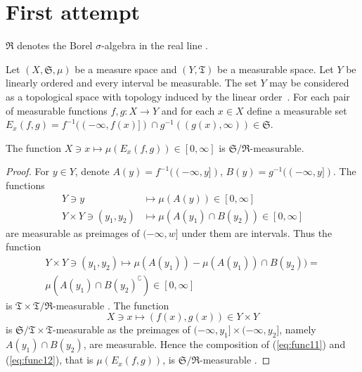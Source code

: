 \section{First attempt}

$\mathfrak{R}$ denotes the Borel $\sigma$-algebra in the real line
\realn.

Let $(X, \mathfrak{S}, \mu)$ be a measure space and $(Y,
\mathfrak{T})$ be a measurable space. Let $Y$ be linearly ordered and
every interval be measurable. The set $Y$ may be considered as a
topological space with topology induced by the linear order~\cite
[p.~130] {kuratowski-1977}. For each pair of measurable functions $f,
g \colon X \to Y$ and for each $x \in X$ define a measurable set
$E_x(f, g) = f^{-1}((-\infty, f(x)]) \cap g^{-1}((g(x), \infty)) \in
  \mathfrak{S}$.

\begin{lem}
The function $X \ni x \mapsto \mu(E_x(f, g)) \in [0, \infty]$ is
$\mathfrak{S}/\mathfrak{R}$-measurable.
\end{lem}

\begin{proof}
For $y \in Y$, denote $A(y) = f^{-1}((-\infty, y])$, $B(y) =
g^{-1}((-\infty, y])$. The functions
\begin{align*}
  Y \ni y & \mapsto \mu(A(y)) \in [0, \infty] \\
  Y \times Y \ni (y_1, y_2) & \mapsto \mu(A(y_1) \cap B(y_2)) \in [0, \infty]
\end{align*}
are measurable as preimages of $(-\infty, w]$ under them are
intervals. Thus the function
\begin{multline} \label{eq:func11}
  Y \times Y \ni (y_1, y_2) \mapsto \mu(A(y_1)) - \mu(A(y_1)) \cap
  B(y_2)) = \\ \mu(A(y_1) \cap B(y_2)^\complement) \in [0, \infty]
\end{multline}
is $\mathfrak{T} \times \mathfrak{T} / \mathfrak{R}$-measurable \cite
[theorem 13.3, p.~183] {billingsley-2009}. The function
\begin{equation} \label{eq:func12}
  X \ni x \mapsto (f(x), g(x)) \in Y \times Y
\end{equation}
is $\mathfrak{S} / \mathfrak{T} \times \mathfrak{T}$-measurable as the
preimages of $(-\infty, y_1] \times (-\infty, y_2]$, namely $A(y_1)
\cap B(y_2)$, are measurable. Hence the composition of
(\ref{eq:func11}) and (\ref{eq:func12}), that is $\mu(E_x(f, g))$, is
$\mathfrak{S} / \mathfrak{R}$-measurable \cite [theorem 13.1, p.~182]
     {billingsley-2009}.
\end{proof}

